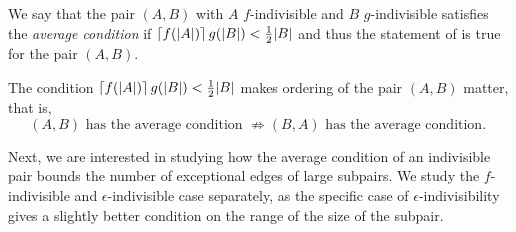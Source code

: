         \begin{definition}
            We say that the pair $(A,B)$ with $A$ $f$-indivisible and $B$ $g$-indivisible satisfies the \emph{average condition} if
            $\left\lceil f(|A|) \right\rceil g(|B|) < \frac{1}{2} |B|$ and thus the statement of  is true for
            the pair $(A,B)$.
        \end{definition}

        \begin{remark}
            The condition $\left\lceil f(|A|) \right\rceil g(|B|) < \frac{1}{2} |B|$ makes ordering of the pair $(A,B)$ matter, that is,
            \[
                (A,B) \text{ has the average condition } \not\Rightarrow (B,A) \text{ has the average condition. }
            \]
        \end{remark}

        Next, we are interested in studying how the average condition of an indivisible pair bounds the number of
        exceptional edges of large subpairs.
        We study the $f$-indivisible and $\epsilon$-indivisible case separately, as the specific case of $\epsilon$-indivisibility gives
        a slightly better condition on the range of the size of the subpair.

